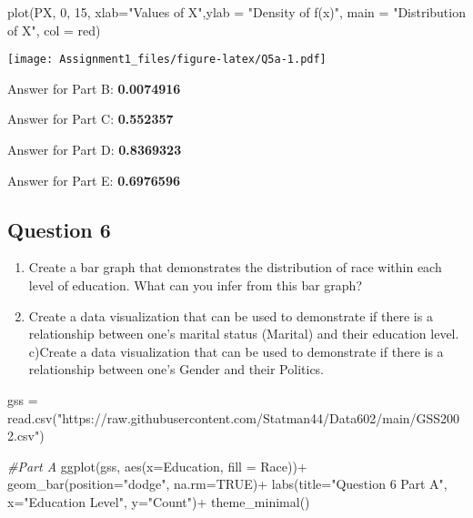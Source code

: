 \documentclass[
]{article}
\newenvironment{Shaded}{\begin{snugshade}}{\end{snugshade}}
\newcommand{\AttributeTok}[1]{\textcolor[rgb]{0.77,0.63,0.00}{#1}}
\newcommand{\CommentTok}[1]{\textcolor[rgb]{0.56,0.35,0.01}{\textit{#1}}}
\newcommand{\ConstantTok}[1]{\textcolor[rgb]{0.00,0.00,0.00}{#1}}
\newcommand{\DecValTok}[1]{\textcolor[rgb]{0.00,0.00,0.81}{#1}}
\newcommand{\FunctionTok}[1]{\textcolor[rgb]{0.00,0.00,0.00}{#1}}
\newcommand{\NormalTok}[1]{#1}
\newcommand{\OtherTok}[1]{\textcolor[rgb]{0.56,0.35,0.01}{#1}}
\newcommand{\SpecialCharTok}[1]{\textcolor[rgb]{0.00,0.00,0.00}{#1}}
\newcommand{\StringTok}[1]{\textcolor[rgb]{0.31,0.60,0.02}{#1}}
\providecommand{\tightlist}{%
  \setlength{\itemsep}{0pt}\setlength{\parskip}{0pt}}
\begin{document}
\begin{Shaded}
\begin{Highlighting}[]
\FunctionTok{plot}\NormalTok{(PX, }\DecValTok{0}\NormalTok{, }\DecValTok{15}\NormalTok{, }\AttributeTok{xlab=}\StringTok{"Values of X"}\NormalTok{,}\AttributeTok{ylab =} \StringTok{"Density of f(x)"}\NormalTok{, }\AttributeTok{main =} \StringTok{"Distribution of X"}\NormalTok{, }\AttributeTok{col =} \StringTok{\textquotesingle{}red\textquotesingle{}}\NormalTok{)}
\end{Highlighting}
\end{Shaded}

\texttt{[image: Assignment1\_files/figure-latex/Q5a-1.pdf]}

Answer for Part B: \textbf{0.0074916}

Answer for Part C: \textbf{0.552357}

Answer for Part D: \textbf{0.8369323}

Answer for Part E: \textbf{0.6976596}

\hypertarget{question-6}{%
\subsection{Question 6}\label{question-6}}

\begin{enumerate}
\def\labelenumi{\alph{enumi})}
\tightlist
\item
  Create a bar graph that demonstrates the distribution of race within
  each level of education. What can you infer from this bar graph?
\item
  Create a data visualization that can be used to demonstrate if there
  is a relationship between one's marital status (Marital) and their
  education level. c)Create a data visualization that can be used to
  demonstrate if there is a relationship between one's Gender and their
  Politics.
\end{enumerate}

\begin{Shaded}
\begin{Highlighting}[]
\NormalTok{gss }\OtherTok{=} \FunctionTok{read.csv}\NormalTok{(}\StringTok{"https://raw.githubusercontent.com/Statman44/Data602/main/GSS2002.csv"}\NormalTok{)}

\CommentTok{\#Part A}
\FunctionTok{ggplot}\NormalTok{(gss, }\FunctionTok{aes}\NormalTok{(}\AttributeTok{x=}\NormalTok{Education, }\AttributeTok{fill =}\NormalTok{ Race))}\SpecialCharTok{+}
  \FunctionTok{geom\_bar}\NormalTok{(}\AttributeTok{position=}\StringTok{"dodge"}\NormalTok{, }\AttributeTok{na.rm=}\ConstantTok{TRUE}\NormalTok{)}\SpecialCharTok{+}
  \FunctionTok{labs}\NormalTok{(}\AttributeTok{title=}\StringTok{"Question 6 Part A"}\NormalTok{, }\AttributeTok{x=}\StringTok{"Education Level"}\NormalTok{, }\AttributeTok{y=}\StringTok{"Count"}\NormalTok{)}\SpecialCharTok{+}
  \FunctionTok{theme\_minimal}\NormalTok{()}
\end{Highlighting}
\end{Shaded}
\end{document}

